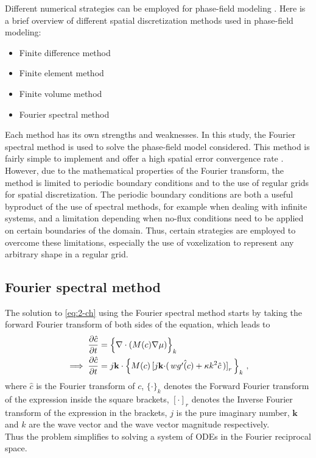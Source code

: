 Different numerical strategies can be employed for phase-field modeling \cite{Wheeler2019}. Here is a brief overview of different spatial discretization methods used in phase-field modeling:
\begin{itemize}
    \item Finite difference method
    \item Finite element method
    \item Finite volume method
    \item Fourier spectral method
\end{itemize}
Each method has its own strengths and weaknesses. In this study, the Fourier spectral method is used to solve the phase-field model considered. This method is fairly simple to implement and offer a high spatial error convergence rate \cite{ChenShen1998,SircaHorvat2012,Biner2017-1}. However, due to the mathematical properties of the Fourier transform, the method is limited to periodic boundary conditions and to the use of regular grids for spatial discretization. The periodic boundary conditions are both a useful byproduct of the use of spectral methods, for example when dealing with infinite systems, and a limitation depending when no-flux conditions need to be applied on certain boundaries of the domain. Thus, certain strategies are employed to overcome these limitations, especially the use of voxelization to represent any arbitrary shape in a regular grid.
\subsection{Fourier spectral method}
    The solution to \autoref{eq:2-ch} using the Fourier spectral method starts by taking the forward Fourier transform of both sides of the equation, which leads to
    \begin{align}
        \frac{\partial \hat{c}}{\partial t} &= \Bigl\{\nabla \cdot ( M(c) \nabla \mu ) \Bigl\}_k\\
        \implies \frac{\partial \hat{c}}{\partial t} &= j\mathbf{k} \cdot \Bigl\{ M(c) \left[j\mathbf{k} \cdot \right(w\hat{g'(c)} + \kappa k^2 \hat{c}\left)\right]_r \Bigl\}_k\ ,
    \end{align}
    where $\hat{c}$ is the Fourier transform of $c$, $\{\cdot\}_k$ denotes the Forward Fourier transform of the expression inside the square brackets, $\left[\cdot\right]_r$  denotes the Inverse Fourier transform of the expression in the brackets, $j$ is the pure imaginary number, $\mathbf{k}$ and $k$ are the wave vector and the wave vector magnitude respectively.\\
    Thus the problem simplifies to solving a system of ODEs in the Fourier reciprocal space.
